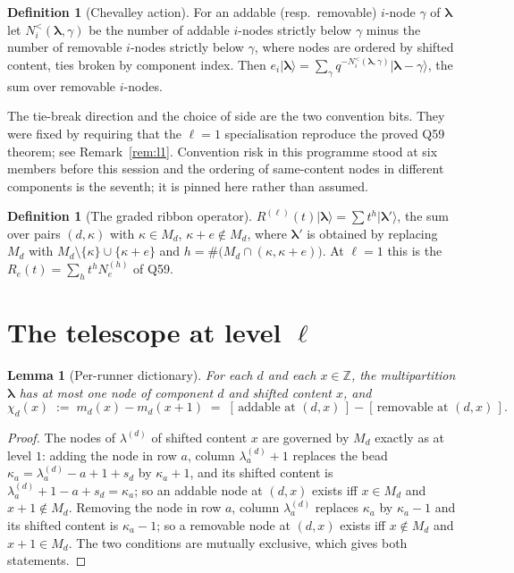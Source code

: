 \documentclass[11pt]{article}
\newtheorem{lemma}[theorem]{Lemma}
\theoremstyle{definition}
\newtheorem{definition}[theorem]{Definition}
\theoremstyle{remark}
\newcommand{\Z}{\mathbb{Z}}
\newcommand{\bl}{\boldsymbol{\lambda}}
\newcommand{\Nlt}{N^{<}}
\newcommand{\ket}[1]{\lvert #1 \rangle}
\begin{document}
\begin{definition}[Chevalley action]\label{def:chev}
For an addable (resp.\ removable) $i$-node $\gamma$ of $\bl$ let
$\Nlt_i(\bl,\gamma)$ be the number of addable $i$-nodes strictly below $\gamma$ minus
the number of removable $i$-nodes strictly below $\gamma$, where nodes are ordered by
shifted content, ties broken by component index. Then
$e_i\ket{\bl}=\sum_\gamma q^{-\Nlt_i(\bl,\gamma)}\ket{\bl-\gamma}$, the sum over
removable $i$-nodes.
\end{definition}

The tie-break direction and the choice of side are the two convention bits. They were
fixed by requiring that the $\ell=1$ specialisation reproduce the proved Q59 theorem;
see Remark~\ref{rem:l1}. Convention risk in this programme stood at six members before
this session and the ordering of same-content nodes in different components is the
seventh; it is pinned here rather than assumed.

\begin{definition}[The graded ribbon operator]\label{def:R}
$R^{(\ell)}(t)\ket{\bl}=\sum t^{h}\ket{\bl'}$, the sum over pairs $(d,\kappa)$ with
$\kappa\in M_d$, $\kappa+e\notin M_d$, where $\bl'$ is obtained by replacing $M_d$ with
$M_d\setminus\{\kappa\}\cup\{\kappa+e\}$ and $h=\#\big(M_d\cap(\kappa,\kappa+e)\big)$.
At $\ell=1$ this is the $R_e(t)=\sum_h t^hN_e^{(h)}$ of Q59.
\end{definition}

\section{The telescope at level $\ell$}\label{sec:tele}

\begin{lemma}[Per-runner dictionary]\label{lem:dict}
For each $d$ and each $x\in\Z$, the multipartition $\bl$ has at most one node of
component $d$ and shifted content $x$, and
\[
\chi_d(x)\;:=\;m_d(x)-m_d(x+1)\;=\;[\,\text{addable at }(d,x)\,]-[\,\text{removable at }(d,x)\,].
\]
\end{lemma}

\begin{proof}
The nodes of $\lambda^{(d)}$ of shifted content $x$ are governed by $M_d$ exactly as at
level $1$: adding the node in row $a$, column $\lambda^{(d)}_a+1$ replaces the bead
$\kappa_a=\lambda^{(d)}_a-a+1+s_d$ by $\kappa_a+1$, and its shifted content is
$\lambda^{(d)}_a+1-a+s_d=\kappa_a$; so an addable node at $(d,x)$ exists iff
$x\in M_d$ and $x+1\notin M_d$. Removing the node in row $a$, column
$\lambda^{(d)}_a$ replaces $\kappa_a$ by $\kappa_a-1$ and its shifted content is
$\kappa_a-1$; so a removable node at $(d,x)$ exists iff $x\notin M_d$ and $x+1\in M_d$.
The two conditions are mutually exclusive, which gives both statements.
\end{proof}
\end{document}
